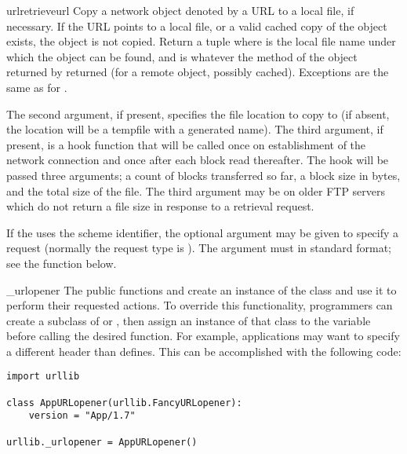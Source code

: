 \begin{funcdesc}{urlretrieve}{url}
Copy a network object denoted by a URL to a local file, if necessary.
If the URL points to a local file, or a valid cached copy of the
object exists, the object is not copied.  Return a tuple
 where  is the
local file name under which the object can be found, and 
is whatever the  method of the object returned by
 returned (for a remote object, possibly cached).
Exceptions are the same as for .

The second argument, if present, specifies the file location to copy
to (if absent, the location will be a tempfile with a generated name).
The third argument, if present, is a hook function that will be called
once on establishment of the network connection and once after each
block read thereafter.  The hook will be passed three arguments; a
count of blocks transferred so far, a block size in bytes, and the
total size of the file.  The third argument may be  on older
FTP servers which do not return a file size in response to a retrieval
request.

If the  uses the  scheme identifier, the optional
 argument may be given to specify a  request
(normally the request type is ).  The  argument
must in standard  format;
see the  function below.
\end{funcdesc}

\begin{datadesc}{_urlopener}
The public functions  and
 create an instance of the
 class and use it to perform their requested
actions.  To override this functionality, programmers can create a
subclass of  or , then assign
an instance of that class to the
 variable before calling the desired function.
For example, applications may want to specify a different
 header than  defines.  This
can be accomplished with the following code:

\begin{verbatim}
import urllib

class AppURLopener(urllib.FancyURLopener):
    version = "App/1.7"

urllib._urlopener = AppURLopener()
\end{verbatim}
\end{datadesc}

